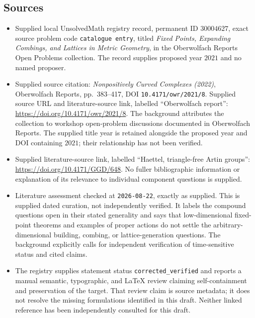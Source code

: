 \documentclass[11pt]{article}
\begin{document}
\subsection{Sources}
\begin{itemize}
\item Supplied local UnsolvedMath registry record, permanent ID \(30004627\), exact source problem code \texttt{catalogue entry}, titled \emph{Fixed Points, Expanding Combings, and Lattices in Metric Geometry}, in the Oberwolfach Reports Open Problems collection. The record supplies proposed year \(2021\) and no named proposer.
\item Supplied source citation: \emph{Nonpositively Curved Complexes (2022)}, Oberwolfach Reports, pp.~383--417, DOI \texttt{10.4171/owr/2021/8}. Supplied source URL and literature-source link, labelled ``Oberwolfach report'': \url{https://doi.org/10.4171/owr/2021/8}. The background attributes the collection to workshop open-problem discussions documented in Oberwolfach Reports. The supplied title year is retained alongside the proposed year and DOI containing \(2021\); their relationship has not been verified.
\item Supplied literature-source link, labelled ``Haettel, triangle-free Artin groups'': \url{https://doi.org/10.4171/GGD/648}. No fuller bibliographic information or explanation of its relevance to individual component questions is supplied.
\item Literature assessment checked at \texttt{2026-08-22}, exactly as supplied. This is supplied dated curation, not independently verified. It labels the compound questions open in their stated generality and says that low-dimensional fixed-point theorems and examples of proper actions do not settle the arbitrary-dimensional building, combing, or lattice-generation questions. The background explicitly calls for independent verification of time-sensitive status and cited claims.
\item The registry supplies statement status \texttt{corrected\_verified} and reports a manual semantic, typographic, and LaTeX review claiming self-containment and preservation of the target. That review claim is source metadata; it does not resolve the missing formulations identified in this draft. Neither linked reference has been independently consulted for this draft.
\end{itemize}
\end{document}
